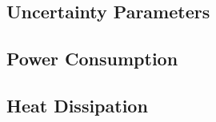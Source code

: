 \subsection{Uncertainty Parameters}


\subsection{Power Consumption}


\subsection{Heat Dissipation}


